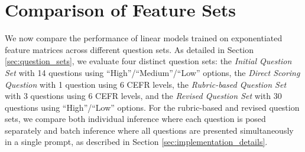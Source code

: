 \documentclass{report}
\begin{document}
\begin{table}[h]
\centering
{}
\caption{Performance comparison of various regression models using features from the \emph{Initial Question Set}.}
\label{table:regression_models}
\end{table}

\section{Comparison of Feature Sets}
\label{sec:comparison_of_feature_sets}
We now compare the performance of linear models trained on exponentiated feature matrices across different question sets. As detailed in Section \ref{sec:question_sets}, we evaluate four distinct question sets: the \emph{Initial Question Set} with 14 questions using ``High''/``Medium''/``Low'' options, the \emph{Direct Scoring Question} with 1 question using 6 CEFR levels, the \emph{Rubric-based Question Set} with 3 questions using 6 CEFR levels, and the \emph{Revised Question Set} with 30 questions using ``High''/``Low'' options. For the rubric-based and revised question sets, we compare both individual inference where each question is posed separately and batch inference where all questions are presented simultaneously in a single prompt, as described in Section \ref{sec:implementation_details}.
\end{document}
